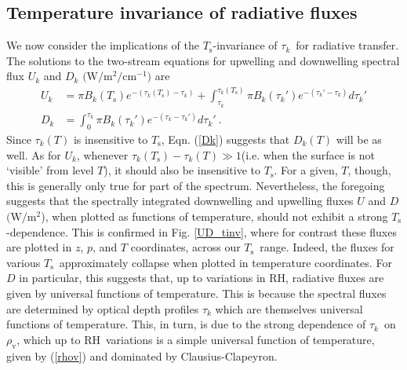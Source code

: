 \documentclass[10pt]{article}
\newcommand{\eqnref}[1]{(\ref{#1})}
\newcommand{\cminverse}{\ensuremath{\mathrm{cm^{-1}}}}
\newcommand{\tauk}{\ensuremath{\tau_k}}
\newcommand{\rhov}{\ensuremath{\rho_\mathrm{v}}}
\newcommand{\Ts}{\ensuremath{T_\mathrm{s}}}
\newcommand{\RH}{\ensuremath{\mathrm{RH}}}
\begin{document}
	\subsection{Temperature invariance of radiative fluxes}
		We now consider the implications of the  \Ts-invariance of \tauk\ for radiative transfer. The solutions to the two-stream  equations for upwelling and downwelling spectral flux $U_k$ and $D_k$ 
		$\mathrm{(W/m^2/\cminverse})$ are 
		\begin{subequations}
			\begin{align}
				U_k & = \pi B_k(\Ts)e^{-(\tauk(\Ts) -\tauk)} + \int_{\tauk}^{\tauk(\Ts)} \pi B_k(\tauk')e^{-(\tauk'-\tauk)} d\tauk'  \label{Uk}\\
				D_k & =  \int_0^{\tauk} \pi B_k(\tauk')e^{-(\tauk-\tauk')} d\tauk'  \ .\label{Dk}
			\end{align}
		\end{subequations}
Since $\tauk(T)$ is insensitive to \Ts, Eqn. \eqnref{Dk} suggests that $D_k(T)$ will be as well. As for $U_k$, whenever $\tauk(\Ts) - \tauk(T) \gg 1$(i.e. when the surface is not `visible' from level $T$),  it should also be insensitive to \Ts. For a given, $T$, though, this is generally only true for part of the spectrum. Nevertheless, the foregoing suggests that the spectrally integrated downwelling and upwelling fluxes  $U$ and $D$ $(\mathrm{W/m^2}$), when plotted as functions of temperature, should not exhibit a strong \Ts-dependence. This is confirmed in Fig. \ref{UD_tinv}, where for contrast these fluxes are plotted in $z$, $p$, and $T$ coordinates, across our \Ts\ range. Indeed, the fluxes for various \Ts\ approximately collapse when plotted in temperature coordinates. For 
$D$ in particular, this suggests that, up to variations in \RH, radiative fluxes are given by universal functions of temperature. This is because the spectral fluxes are determined by optical depth profiles $\tauk$ which are themselves universal functions of temperature. This, in turn, is due to the strong dependence of \tauk\ on \rhov, which up to \RH\ variations is a simple universal function of temperature, given by \eqnref{rhov} and dominated by Clausius-Clapeyron.
\end{document}
